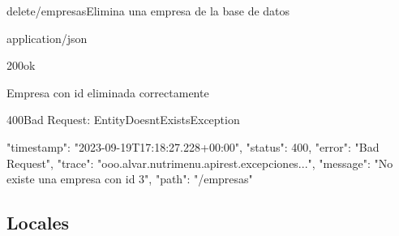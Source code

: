\begin{apiRoute}{delete}{/empresas}{Elimina una empresa de la base de datos}
	\begin{routeParameter}
	\end{routeParameter}
	\begin{routeResponse}{application/json}
		\begin{routeResponseItem}{200}{ok}
			\begin{routeResponseItemBody}
Empresa con id eliminada correctamente	
			\end{routeResponseItemBody}
		\end{routeResponseItem}
		
\begin{routeResponseItem}{400}{Bad Request: EntityDoesntExistsException}
			\begin{routeResponseItemBody}
{
    "timestamp": "2023-09-19T17:18:27.228+00:00",
    "status": 400,
    "error": "Bad Request",
    "trace": "ooo.alvar.nutrimenu.apirest.excepciones...",
    "message": "No existe una empresa con id 3",
    "path": "/empresas"
}
			\end{routeResponseItemBody}
		\end{routeResponseItem}
		
	\end{routeResponse}
\end{apiRoute}

\subsection{Locales}

